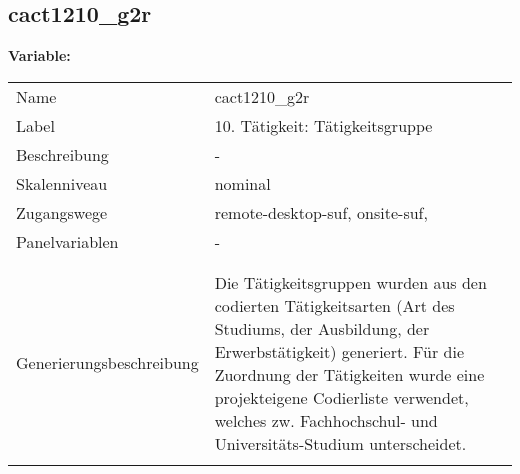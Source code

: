 	
	
	\subsection{cact1210\_g2r}
	\label{subSection:cact1210_g2r}

	\noindent\textbf{Variable:}\\
		\begin{tabular}{lL{11.3cm}}
			\label{tableVariable:cact1210_g2r}
			Name & cact1210\_g2r \\
			Label & 10. Tätigkeit: Tätigkeitsgruppe  \\
			Beschreibung & - \\
			Skalenniveau & nominal \\
			Zugangswege &
				remote-desktop-suf,
				onsite-suf,
 \\
			Panelvariablen & -
			 \\
			 \\
 \\
					Generierungsbeschreibung & Die Tätigkeitsgruppen wurden aus den codierten Tätigkeitsarten (Art des Studiums, der Ausbildung, der Erwerbstätigkeit) generiert. Für die Zuordnung der Tätigkeiten wurde eine projekteigene Codierliste verwendet, welches zw. Fachhochschul- und Universitäts-Studium unterscheidet.
				 \\	
			 \\
		\end{tabular}






